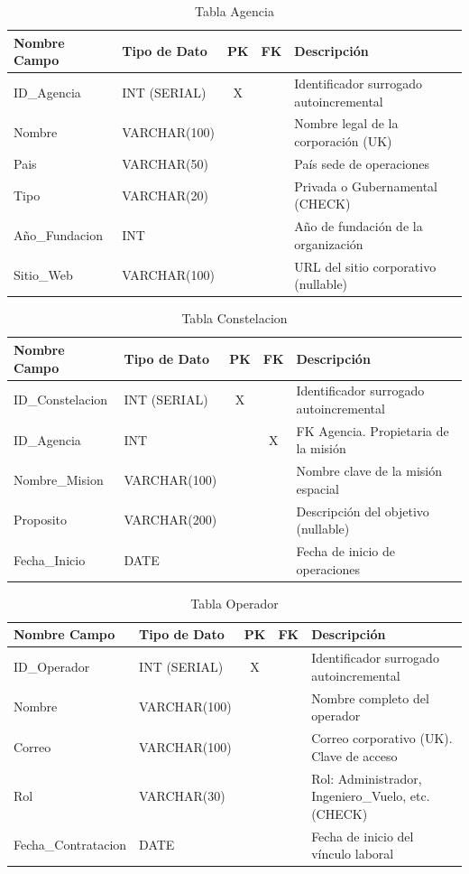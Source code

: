 \begin{table}[H]
\centering
\footnotesize
\begin{tabular}{|l|l|c|c|p{5cm}|}
\hline
\textbf{Nombre Campo} & \textbf{Tipo de Dato} & \textbf{PK} & \textbf{FK} & \textbf{Descripción} \\
\hline
ID\_Agencia & INT (SERIAL) & X & & Identificador surrogado autoincremental \\
\hline
Nombre & VARCHAR(100) & & & Nombre legal de la corporación (UK) \\
\hline
Pais & VARCHAR(50) & & & País sede de operaciones \\
\hline
Tipo & VARCHAR(20) & & & Privada o Gubernamental (CHECK) \\
\hline
Año\_Fundacion & INT & & & Año de fundación de la organización \\
\hline
Sitio\_Web & VARCHAR(100) & & & URL del sitio corporativo (nullable) \\
\hline
\end{tabular}
\caption{Tabla Agencia}
\end{table}

\begin{table}[H]
\centering
\footnotesize
\begin{tabular}{|l|l|c|c|p{5cm}|}
\hline
\textbf{Nombre Campo} & \textbf{Tipo de Dato} & \textbf{PK} & \textbf{FK} & \textbf{Descripción} \\
\hline
ID\_Constelacion & INT (SERIAL) & X & & Identificador surrogado autoincremental \\
\hline
ID\_Agencia & INT & & X & FK Agencia. Propietaria de la misión \\
\hline
Nombre\_Mision & VARCHAR(100) & & & Nombre clave de la misión espacial \\
\hline
Proposito & VARCHAR(200) & & & Descripción del objetivo (nullable) \\
\hline
Fecha\_Inicio & DATE & & & Fecha de inicio de operaciones \\
\hline
\end{tabular}
\caption{Tabla Constelacion}
\end{table}

\begin{table}[H]
\centering
\footnotesize
\begin{tabular}{|l|l|c|c|p{5cm}|}
\hline
\textbf{Nombre Campo} & \textbf{Tipo de Dato} & \textbf{PK} & \textbf{FK} & \textbf{Descripción} \\
\hline
ID\_Operador & INT (SERIAL) & X & & Identificador surrogado autoincremental \\
\hline
Nombre & VARCHAR(100) & & & Nombre completo del operador \\
\hline
Correo & VARCHAR(100) & & & Correo corporativo (UK). Clave de acceso \\
\hline
Rol & VARCHAR(30) & & & Rol: Administrador, Ingeniero\_Vuelo, etc. (CHECK) \\
\hline
Fecha\_Contratacion & DATE & & & Fecha de inicio del vínculo laboral \\
\hline
\end{tabular}
\caption{Tabla Operador}
\end{table}

